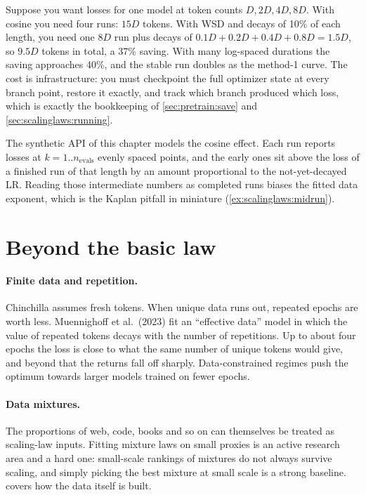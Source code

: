 \begin{napkinmath}
Suppose you want losses for one model at token counts $D, 2D, 4D, 8D$. With cosine you need
four runs: $15D$ tokens. With WSD and decays of 10\% of each length, you need one $8D$ run plus
decays of $0.1D+0.2D+0.4D+0.8D=1.5D$, so $9.5D$ tokens in total, a 37\% saving. With many
log-spaced durations the saving approaches 40\%, and the stable run doubles as the
method-1 curve. The cost is infrastructure: you must checkpoint the full optimizer state at
every branch point, restore it exactly, and track which branch produced which loss, which is
exactly the bookkeeping of \cref{sec:pretrain:save} and \cref{sec:scalinglaws:running}.
\end{napkinmath}

The synthetic API of this chapter models the cosine effect. Each run reports losses at
$k=1..n_{\text{evals}}$ evenly spaced points, and the early ones sit above the loss of a finished
run of that length by an amount proportional to the not-yet-decayed LR. Reading those
intermediate numbers as completed runs biases the fitted data exponent, which is the Kaplan
pitfall in miniature (\cref{ex:scalinglaws:midrun}).

\section{Beyond the basic law}\label{sec:scalinglaws:beyond}

\paragraph{Finite data and repetition.} Chinchilla assumes fresh tokens. When unique data runs
out, repeated epochs are worth less. Muennighoff et al.\ (2023) fit an ``effective data''
model in which the value of repeated tokens decays with the number of repetitions. Up to about
four epochs the loss is close to what the same number of unique tokens would give, and beyond that
the returns fall off sharply. Data-constrained regimes push the optimum towards larger models
trained on fewer epochs.

\paragraph{Data mixtures.} The proportions of web, code, books and so on can themselves be
treated as scaling-law inputs. Fitting mixture laws on small proxies is an active research area
and a hard one: small-scale rankings of mixtures do not always survive scaling, and simply
picking the best mixture at small scale is a strong baseline.
 covers how the data itself is built.

